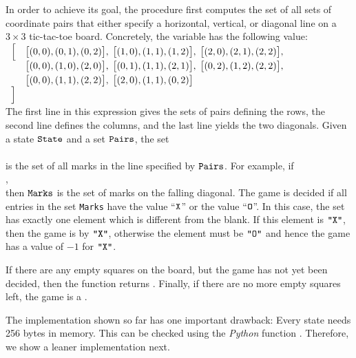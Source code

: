 \begin{enumerate}
      In order to achieve its goal, the procedure first computes the set of all sets of coordinate pairs that 
      either specify a horizontal, vertical, or diagonal line on a $3 \times 3$ tic-tac-toe board.  Concretely,
      the variable  has the following value:
      \\[0.2cm]
      \hspace*{1.3cm}
      $
      \begin{array}{ll}
       \Bigl[ & \bigl[(0, 0), (0, 1), (0, 2)\bigr], \;
                \bigl[(1, 0), (1, 1), (1, 2)\bigr], \;
                \bigl[(2, 0), (2, 1), (2, 2)\bigr],   \\[0.1cm]
              & \bigl[(0, 0), (1, 0), (2, 0)\bigr], \;
                \bigl[(0, 1), (1, 1), (2, 1)\bigr], \;
                \bigl[(0, 2), (1, 2), (2, 2)\bigr],   \\[0.1cm]
              & \bigl[(0, 0), (1, 1), (2, 2)\bigr], \;
                \bigl[(2, 0), (1, 1), (0, 2)\bigr]    \\
       \Bigr]
      \end{array}
      $
      \\[0.2cm]
      The first line in this expression gives the sets of pairs defining the rows, the second line defines 
      the columns, and the last line yields the two diagonals.  Given a state $\texttt{State}$ and a set
      $\texttt{Pairs}$, the set 
      \\[0.2cm]
      \hspace*{1.3cm}
      \\[0.2cm]
      is the set of all marks in the line specified by $\texttt{Pairs}$.  For example, if 
      \\[0.2cm]
      \hspace*{1.3cm}
      ,
      \\[0.2cm]
      then $\texttt{Marks}$ is the set of marks on the falling diagonal.
      The game is decided if all entries in the set \texttt{Marks} have the value
      ``$\texttt{X}$'' or the value ``$\texttt{O}$''.  In this case, the set  has exactly one
      element which is different from the blank.  If this element is $\texttt{"X"}$, then the
      game is  by $\texttt{"X"}$, otherwise the element must be $\texttt{"O"}$ and hence
      the game has a value of $-1$ for $\texttt{"X"}$.

      If there are any empty squares on the board, but the game has not yet been decided,
      then the function returns .  Finally, if there are no more empty squares left, the game is a
      . 
\end{enumerate}
The implementation shown so far has one important drawback: Every state needs 256 bytes in memory.
This can be checked using the \textsl{Python} function .
Therefore, we show a leaner implementation next.

